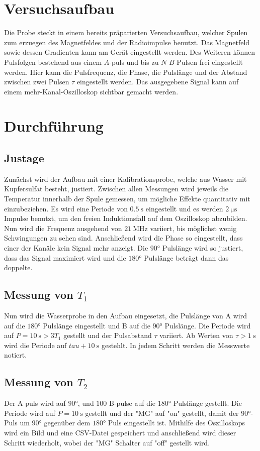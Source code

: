 \section{Versuchsaufbau}
Die Probe steckt in einem bereits präparierten Versuchsaufbau, welcher Spulen zum erzuegen des Magnetfeldes und der Radioimpulse benutzt.
Das Magnetfeld sowie dessen Gradienten kann am Gerät eingestellt werden. 
Des Weiteren können Pulsfolgen bestehend aus einem $A$-puls und bis zu $N$ $B$-Pulsen frei eingestellt werden.
Hier kann die Pulsfrequenz, die Phase, die Pulslänge und der Abstand zwischen zwei Pulsen $\tau$ eingestellt werden.
Das ausgegebene Signal kann auf einem mehr-Kanal-Oszilloskop sichtbar gemacht werden.
\section{Durchführung}
\subsection{Justage}
Zunächst wird der Aufbau mit einer Kalibrationsprobe, welche aus Wasser mit Kupfersulfat besteht, justiert.
Zwischen allen Messungen wird jeweils die Temperatur innerhalb der Spule gemessen, um mögliche Effekte quantitativ mit einzubeziehen.
Es wird eine Periode von $\SI{0.5}{\second} $ eingestellt und es werden $\SI{2}{\micro\second}$ Impulse benutzt, um den freien Induktionsfall auf dem Oszilloskop abzubilden.
Nun wird die Frequenz ausgehend von $\SI{21}{\MHz}$ variiert, bis möglichst wenig Schwingungen zu sehen sind. Anschließend wird die Phase so eingestellt, dass einer der Kanäle kein Signal mehr anzeigt.
Die $90°$ Pulslänge wird so justiert, dass das Signal maximiert wird und die $180°$ Pulslänge beträgt dann das doppelte.
\subsection{Messung von $T_1$}
Nun wird die Wasserprobe in den Aufbau eingesetzt, die Pulslänge von A wird auf die $180°$ Pulslänge eingestellt und B auf die $90°$ Pulslänge. Die Periode wird auf $ P = \SI{10}{\second} > 3 T_1$ gestellt und der Pulsabstand $\tau $ variiert. 
Ab Werten von $\tau >\SI{1}{\second}$ wird die Periode auf $tau + \SI{10}{\second}$ gestehlt. In jedem Schritt werden die Messwerte notiert.
\subsection{Messung von $T_2$}
Der A puls wird auf $90°$, und $100$ B-pulse auf die $180°$ Pulslänge gestellt.
Die Periode wird auf $P = \SI{10}{\second}$ gestellt und der "MG" auf "on" gestellt, damit der $90°$-Puls um $90°$ gegenüber dem $180°$ Puls eingestellt ist.
Mithilfe des Oszilloskops wird ein Bild und eine CSV-Datei gespeichert und anschließend wird dieser Schritt wiederholt, wobei der "MG" Schalter auf "off" gestellt wird.

